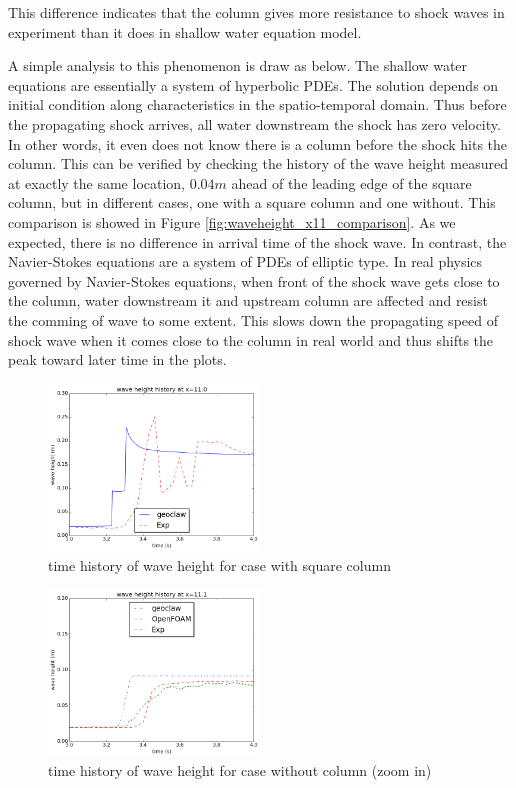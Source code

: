 \documentclass[11pt]{article}
\begin{document}
This difference indicates that the column gives more resistance to shock waves in experiment than it does in shallow water equation model. 
\par
A simple analysis to this phenomenon is draw as below.
The shallow water equations are essentially a system of hyperbolic PDEs. The solution depends on initial condition along characteristics in the spatio-temporal domain. 
Thus before the propagating shock arrives, all water downstream the shock has zero velocity. 
In other words, it even does not know there is a column before the shock hits the column.
This can be verified by checking the history of the wave height measured at exactly the same location, $0.04m$ ahead of the leading edge of the square column, but in different cases, one with a square column and one without.
This comparison is showed in Figure \ref{fig:waveheight_x11_comparison}. As we expected, there is no difference in arrival time of the shock wave.
In contrast, the Navier-Stokes equations are a system of PDEs of elliptic type. 
In real physics governed by Navier-Stokes equations, when front of the shock wave gets close to the column, water downstream it and upstream column are affected and resist the comming of wave to some extent. 
This slows down the propagating speed of shock wave when it comes close to the column in real world and thus shifts the peak toward later time in the plots.
\begin{figure}[h!]
    \centering
    \includegraphics[width=0.5\textwidth]{./plots/waveheight_square_x11}
    \caption{time history of wave height for case with square column}
    \label{fig:waveheight_square_x=11.0}
\end{figure}
\begin{figure}[h!]
    \centering
    \includegraphics[width=0.5\textwidth]{./plots/waveheight_nocolumn_zoomin}
    \caption{time history of wave height for case without column (zoom in)}
    \label{fig:waveheight_nocolumn_zoomin}
\end{figure}
\end{document}

